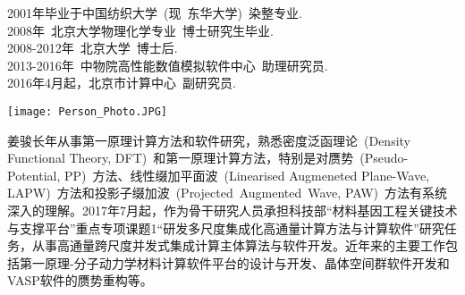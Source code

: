 \thispagestyle{fancy}   %
\vskip 40pt
\begin{minipage}[b]{0.75\textwidth}
{}
\vskip 5pt
{\fontsize{11.0pt}{10.0pt}\selectfont{姜骏，北京市计算中心~~副研究员}}
\vskip 4pt
2001年毕业于中国纺织大学~(现~东华大学)~染整专业.\\
2008年~北京大学物理化学专业~博士研究生毕业.\\
2008-2012年~北京大学~博士后.\\
2013-2016年~中物院高性能数值模拟软件中心~助理研究员.\\
2016年4月起，北京市计算中心~副研究员.
\end{minipage}
\hskip 2pt
\begin{minipage}[b]{0.20\textwidth}
\vspace{17pt}
\texttt{[image: Person\_Photo.JPG]}
\end{minipage}
\vskip 30pt

姜骏长年从事第一原理计算方法和软件研究，熟悉密度泛函理论~(\textrm{Density Functional Theory, DFT})~和第一原理计算方法，特别是对赝势~(\textrm{Pseudo-Potential, PP})~方法、线性缀加平面波~(\textrm{Linearised Augmeneted Plane-Wave, LAPW})~方法和投影子缀加波~(\textrm{Projected~Augmented~Wave, PAW})~方法有系统深入的理解。2017年7月起，作为骨干研究人员承担科技部“材料基因工程关键技术与支撑平台”重点专项课题1“研发多尺度集成化高通量计算方法与计算软件”研究任务，从事高通量跨尺度并发式集成计算主体算法与软件开发。近年来的主要工作包括第一原理-分子动力学材料计算软件平台的设计与开发、晶体空间群软件开发和VASP软件的赝势重构等。


